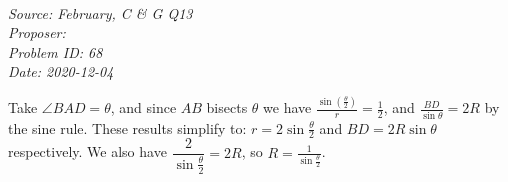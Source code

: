 \SSbreak\\
\emph{Source:  February, C \& G Q13}\\
\emph{Proposer: \Pss}\\
\emph{Problem ID: 68}\\
\emph{Date: 2020-12-04}\\
\SSbreak

\bigskip

\begin{solution}\hfil\medskip

Take \(\angle BAD=\theta\), and since \(AB\) bisects \(\theta\) we have \(\frac{\sin\left(\frac{\theta}{2}\right)}{r}=\frac{1}{2}\), and \(\frac{BD}{\sin\theta}=2R\) by the sine rule. These results simplify to: \(r=2\sin\frac{\theta}{2}\) and \(BD=2R\sin\theta\) respectively. We also have \(\dfrac{2}{\sin\frac{\theta}{2}}=2R\), so \(R=\frac{1}{\sin\frac{\theta}{2}}\).


\end{solution}
